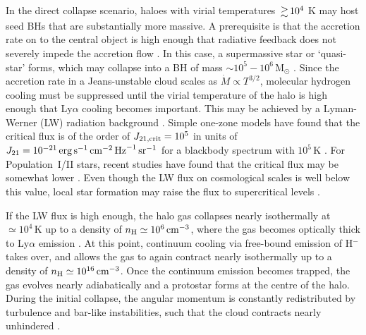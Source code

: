 \documentclass[useAMS,usenatbib]{mnras}
\newcommand{\cmmm}{\text{cm}^{-3}}
\newcommand{\nh}{n_{\rm H}}
\newcommand{\msun}{\text{M}_\odot}
\begin{document}
In the direct collapse scenario, haloes with virial temperatures $\ga 10^4$ K may host seed BHs that are substantially more massive. A prerequisite is that the accretion rate on to the central object is high enough that radiative feedback does not severely impede the accretion flow \citep{Johnson_2011,Johnson_2012, Hosokawa_2012, Hosokawa_2013}. In this case, a supermassive star or `quasi-star' forms, which may collapse into a BH of mass $\sim 10^5-10^6\,\msun$ \citep{Heger_2003, Begelman_2006, Begelman_2008, Begelman_2010, Volonteri_Begelman_2010, Montero_2012, Volonteri_2012, Inayoshi_2013, Schleicher_2013, Chen_2014}. Since the accretion rate in a Jeans-unstable cloud scales as ${\dot M}\propto T^{3/2}$, molecular hydrogen cooling must be suppressed until the virial temperature of the halo is high enough that Ly$\alpha$ cooling becomes important. This may be achieved by a Lyman-Werner (LW) radiation background \citep{Omukai_2001, Bromm_2003, Volonteri_2005, Spaans_2006, Schleicher_2010, Johnson_2013}. Simple one-zone models have found that the critical flux is of the order of $J_{21, {\rm crit}}=10^5$ in units of $J_{21} = 10^{-21}\,{\rm erg}\,{\rm s}^{-1}\,{\rm cm}^{-2}\,{\rm Hz}^{-1}\,{\rm sr}^{-1}$ for a blackbody spectrum with $10^5\,$K \citep{Omukai_2001}. For Population~I/II stars, recent studies have found that the critical flux may be somewhat lower \citep{Shang_2010, Wolcott-Green_2012, Van_Borm_2013, Agarwal_2014, Latif_2014a, Latif_2014c, Regan_2014b, Sugimura_2014}. Even though the LW flux on cosmological scales is well below this value, local star formation may raise the flux to supercritical levels \citep{Dijkstra_2008, Dijkstra_2014, Agarwal_2012, Agarwal_2014b, Visbal_2014}.

If the LW flux is high enough, the halo gas collapses nearly isothermally at $\simeq 10^4\,$K up to a density of $\nh\simeq 10^6\,\cmmm$, where the gas becomes optically thick to Ly$\alpha$ emission \citep{Omukai_2001}. At this point, continuum cooling via free-bound emission of H$^-$ takes over, and allows the gas to again contract nearly isothermally up to a density of $\nh\simeq 10^{16}\,\cmmm$. Once the continuum emission becomes trapped, the gas evolves nearly adiabatically and a protostar forms at the centre of the halo. During the initial collapse, the angular momentum is constantly redistributed by turbulence and bar-like instabilities, such that the cloud contracts nearly unhindered \citep{Oh_2002, Koushiappas_2004, Begelman_2006, Lodato_2006, Wise_2008, Begelman_2009, Choi_2013, Latif_2013a, Prieto_2013}.
\end{document}
